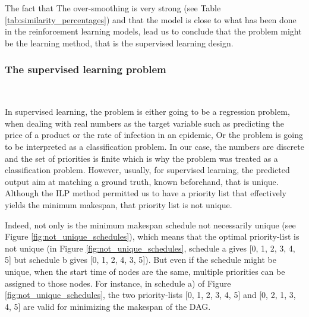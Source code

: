 The fact that The over-smoothing is very strong (see Table \ref{tab:similarity_percentages})
and that the model is close to what has been done in the reinforcement learning models\cite{Lee2021GlobalDagSchedDRL}\cite{Zhao2024GATDRLmodel},
lead us to conclude that the problem might be the learning method, 
that is the supervised learning design.

\subsubsection{The supervised learning problem}
~

In supervised learning, the problem is either going to be a
regression problem, when dealing with real numbers as the target variable
such as predicting the price of a product or the rate of infection in an epidemic,
Or the problem is going to be interpreted as a classification problem.
In our case, the numbers are discrete and the set of priorities is finite
which is why the problem was treated as a classification problem.
However, usually, for supervised learning, the predicted output 
aim at matching a ground truth, known beforehand, that is unique.
Although the ILP method permitted us to have a priority list that
effectively yields the minimum makespan,
that priority list is not unique.

Indeed, not only is the minimum makespan schedule not necessarily unique
(see Figure \ref{fig:not_unique_schedules}),
which means that the optimal priority-list is not unique
(in Figure \ref{fig:not_unique_schedules}, schedule a gives 
[0, 1, 2, 3, 4, 5] but schedule b gives [0, 1, 2, 4, 3, 5]).
But even if the schedule might be unique, when the start time
of nodes are the same, multiple priorities
can be assigned to those nodes.
For instance, in schedule a) of Figure \ref{fig:not_unique_schedules},
the  two priority-lists [0, 1, 2, 3, 4, 5] and [0, 2, 1, 3, 4, 5]
are valid for minimizing the makespan of the DAG.

